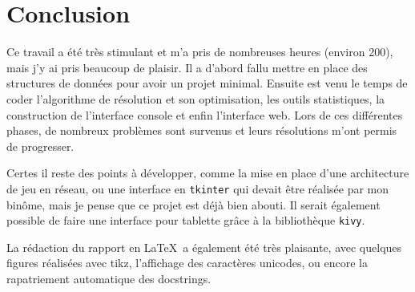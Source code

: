\chapter{Conclusion}
Ce travail a été très stimulant et m'a pris de nombreuses heures (environ 200), mais j'y ai pris beaucoup de plaisir. Il a d'abord fallu mettre en place des structures de données pour avoir un projet minimal. Ensuite est venu le temps de coder l'algorithme de résolution et son optimisation, les outils statistiques, la construction de l'interface console et enfin l'interface web. Lors de ces différentes phases, de nombreux problèmes sont survenus et leurs résolutions m'ont permis de progresser.

Certes il reste des points à développer, comme la mise en place d'une architecture de jeu en réseau, ou une interface en \texttt{tkinter} qui devait être réalisée par mon binôme, mais je pense que ce projet est déjà bien abouti. Il serait également possible de faire une interface pour tablette grâce à la bibliothèque \texttt{kivy}.

La rédaction du rapport en \LaTeX\ a également été très plaisante, avec quelques figures réalisées avec tikz, l'affichage des caractères unicodes, ou encore la rapatriement automatique des docstrings. 
%
%
